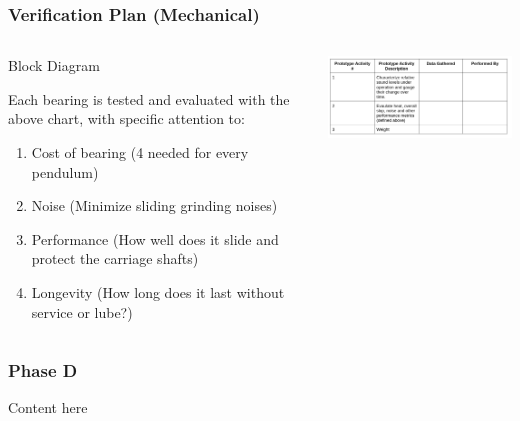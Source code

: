 \documentclass[aspectratio=169]{beamer}
\begin{document}
\begin{frame}
\end{frame}

\begin{frame}
    \frametitle{Verification Plan (Mechanical)}

    \begin{columns}
        \begin{column}{0.40\textwidth}
            \begin{block}{Block Diagram}
                \tiny{
                    Each bearing is tested and evaluated with the above chart, with specific attention to:
                    \begin{enumerate}
                        \item Cost of bearing (4 needed for every pendulum)
                        \item Noise (Minimize sliding grinding noises)
                        \item Performance (How well does it slide and protect the carriage shafts)
                        \item Longevity (How long does it last without service or lube?)
                    \end{enumerate}
                }
            \end{block}
        \end{column}

        \begin{column}{0.58\textwidth}
            \includegraphics[width=8.5cm]{MechanicalPrototype}
        \end{column}
    \end{columns}

\end{frame}


\begin{frame}
    \frametitle{Phase D}

    Content here

\end{frame}
\end{document}
